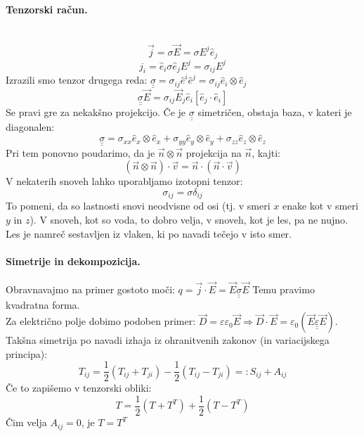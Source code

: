\documentclass[a4paper]{article}
\newcommand{\vct}[1]{\overrightarrow{#1}}
\newcommand{\dunderline}[1]{\underline{\underline{#1}}}
\begin{document}
\paragraph{Tenzorski račun.} \text{} \\
$$\vct{j} = \sigma \vct{E} = \sigma E^j\hat{e}_j$$
$$j_i = \hat{e}_i\sigma\hat{e}_j E^j = \sigma_{ij}E^j$$
Izrazili smo tenzor drugega reda: $\underline{\underline{\sigma}} = \sigma_{ij}\hat{e}^i\hat{e}^j = \sigma_{ij} \hat{e}_i \otimes \hat{e}_j$
$$\underline{\underline{\sigma}}\vct{E} = \sigma_{ij}\vct{E}_j\hat{e}_i\left[\hat{e}_j\cdot\hat{e}_i\right]$$
Se pravi gre za nekakšno projekcijo. Če je $\dunderline{\sigma}$ simetričen, obstaja baza, v kateri je diagonalen:
$$\dunderline{\sigma} = \sigma_{xx}\hat{e}_x\otimes\hat{e}_x + \sigma_{yy}\hat{e}_y\otimes\hat{e}_y + \sigma_{zz}\hat{e}_z\otimes\hat{e}_z$$
Pri tem ponovno poudarimo, da je $\vct{n} \otimes \vct{n}$ projekcija na $\vct{n}$, kajti:
$$(\vct{n} \otimes \vct{n})\cdot\vct{v} = \vct{n}\cdot(\vct{n}\cdot\vct{v})$$
V nekaterih snoveh lahko uporabljamo izotopni tenzor:
$$\sigma_{ij} = \sigma\delta_{ij}$$
To pomeni, da so lastnosti snovi neodvisne od osi (tj. v smeri $x$ enake kot v smeri $y$ in $z$). V snoveh, kot so voda, to dobro velja, v snoveh, kot je les, pa ne nujno.
Les je namreč sestavljen iz vlaken, ki po navadi tečejo v isto smer.
\paragraph{Simetrije in dekompozicija.} Obravnavajmo na primer gostoto moči: $q = \vct{j} \cdot \vct{E} = \vct{E} \dunderline{\sigma} \vct{E}$
Temu pravimo kvadratna forma. \\
Za električno polje dobimo podoben primer: $\vct{D} = \varepsilon\varepsilon_0\vct{E} \Rightarrow \vct{D}\cdot\vct{E} = \varepsilon_0 (\vct{E} \dunderline{\varepsilon} \vct{E})$.
Takšna simetrija po navadi izhaja iz ohranitvenih zakonov (in variacijskega principa):
$$T_{ij} = \frac{1}{2}\left(T_{ij} + T_{ji}\right) - \frac{1}{2}\left(T_{ij} - T_{ji}\right) =: S_{ij} + A_{ij}$$
Če to zapišemo v tenzorski obliki:
$$T = \frac{1}{2}\left(T + T^T\right) + \frac{1}{2}\left(T - T^T\right)$$
Čim velja $A_{ij} = 0$, je $T = T^T$
\end{document}
